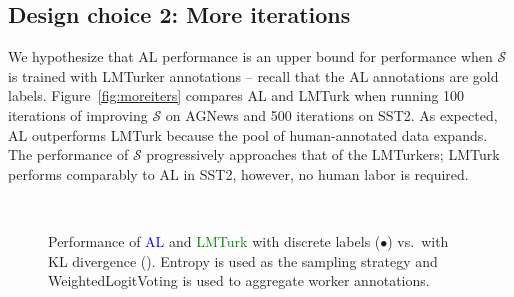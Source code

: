 \documentclass[11pt]{article}
\def\md{LMTurk\xspace}
\def\mdr{LMTurker\xspace}
\def\mdrs{LMTurkers\xspace}
\def\figref#1{Figure~\ref{fig:#1}}
\def\figlabel#1{\label{fig:#1}\label{p:#1}}
\begin{document}
\subsection{Design choice 2: More iterations}
We hypothesize that AL performance is an upper bound for
performance when $\mathcal{S}$
is trained with
\mdr annotations -- recall that the AL annotations are gold labels.
\figref{moreiters} compares
AL and \md when running
100 iterations of improving $\mathcal{S}$ on AGNews
and
500 iterations on SST2.
As expected, AL
outperforms \md because
the pool of human-annotated data expands.
The performance of
$\mathcal{S}$ progressively 
approaches that of
the \mdrs; \md performs
comparably to AL in SST2,
however, no human labor is required.



\begin{figure}[t]
\centering
{}
\vspace{-.2cm}
\\
\vspace{-.2cm}
\vspace{-.2cm}
\caption{
  Performance of \textcolor{blue}{AL}
  and \textcolor{green}{\md}
  with  discrete labels ($\bullet$) vs.\
  with KL divergence (\tiny\XSolidBold\normalsize).
  Entropy is used as the sampling strategy
  and WeightedLogitVoting is used 
  to aggregate worker annotations.
}
\figlabel{kllogits}
\end{figure}
\end{document}
